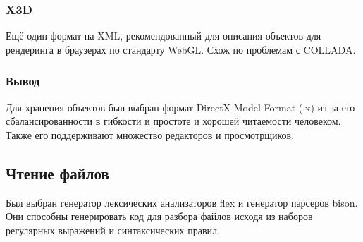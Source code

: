 \documentclass[a4paper,12pt]{report}
\begin{document}
\subsubsection*{X3D}
Ещё один формат на XML, рекомендованный для описания объектов для рендеринга в браузерах по стандарту WebGL. Схож по проблемам с COLLADA.
\subsubsection*{Вывод}
Для хранения объектов был выбран формат DirectX Model Format (.x) из-за его сбалансированности в гибкости и простоте и хорошей читаемости человеком. Также его поддерживают множество редакторов и просмотрщиков.

\subsection{Чтение файлов}

Был выбран генератор лексических анализаторов flex и генератор парсеров bison. Они способны генерировать код для разбора файлов исходя из наборов регулярных выражений и синтаксических правил.
\end{document}
